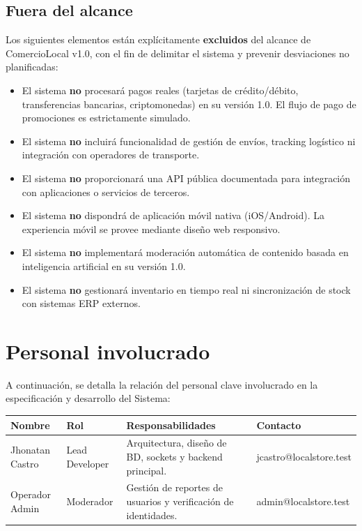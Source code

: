 \documentclass[11pt,a4paper]{report}
\begin{document}
\subsection{Fuera del alcance}
Los siguientes elementos están explícitamente \textbf{excluidos} del alcance de ComercioLocal v1.0, con el fin de delimitar el sistema y prevenir desviaciones no planificadas:
\begin{itemize}
    \item El sistema \textbf{no} procesará pagos reales (tarjetas de crédito/débito, transferencias bancarias, criptomonedas) en su versión 1.0. El flujo de pago de promociones es estrictamente simulado.
    \item El sistema \textbf{no} incluirá funcionalidad de gestión de envíos, tracking logístico ni integración con operadores de transporte.
    \item El sistema \textbf{no} proporcionará una API pública documentada para integración con aplicaciones o servicios de terceros.
    \item El sistema \textbf{no} dispondrá de aplicación móvil nativa (iOS/Android). La experiencia móvil se provee mediante diseño web responsivo.
    \item El sistema \textbf{no} implementará moderación automática de contenido basada en inteligencia artificial en su versión 1.0.
    \item El sistema \textbf{no} gestionará inventario en tiempo real ni sincronización de stock con sistemas ERP externos.
\end{itemize}

\section{Personal involucrado}
A continuación, se detalla la relación del personal clave involucrado en la especificación y desarrollo del Sistema:

\begin{table}[H]
\centering
\begin{tabularx}{\textwidth}{|l|l|L|l|}
\hline
{}\color{white}\textbf{Nombre} & \color{white}\textbf{Rol} & \color{white}\textbf{Responsabilidades} & \color{white}\textbf{Contacto} \\ \hline
Jhonatan Castro & Lead Developer & Arquitectura, diseño de BD, sockets y backend principal. & jcastro@localstore.test \\ \hline
Operador Admin & Moderador & Gestión de reportes de usuarios y verificación de identidades. & admin@localstore.test \\ \hline
\end{tabularx}
\end{table}
\end{document}
